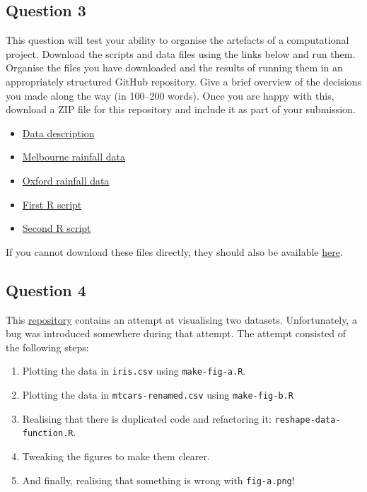 \documentclass[11pt,onecolumn]{scrartcl}
\begin{document}
\subsection{Question 3}
\label{sec:orgd334353}

This question will test your ability to organise the artefacts of a
computational project. Download the scripts and data files using the links below
and run them. Organise the files you have downloaded and the results of running
them in an appropriately structured GitHub repository. Give a brief overview of
the decisions you made along the way (in 100--200 words). Once you are happy
with this, download a ZIP file for this repository and include it as part of
your submission.

\begin{itemize}
\item \href{./homework-question-3/data-sources.txt}{Data description}
\item \href{./homework-question-3/melbourne.csv}{Melbourne rainfall data}
\item \href{./homework-question-3/oxford.txt}{Oxford rainfall data}
\item \href{./homework-question-3/combine-data.R}{First R script}
\item \href{./homework-question-3/make-plot.R}{Second R script}
\end{itemize}

If you cannot download these files directly, they should also be available \href{https://github.com/aezarebski/github-tutorial/tree/main/homework-question-3}{here}.

\subsection{Question 4}
\label{sec:orgcd75cba}

This \href{https://github.com/aezarebski/biology-github-tutorial}{repository} contains an attempt at visualising two datasets. Unfortunately,
a bug was introduced somewhere during that attempt. The attempt consisted of the
following steps:

\begin{enumerate}
\item Plotting the data in \texttt{iris.csv} using \texttt{make-fig-a.R}.
\item Plotting the data in \texttt{mtcars-renamed.csv} using \texttt{make-fig-b.R}
\item Realising that there is duplicated code and refactoring it:
\texttt{reshape-data-function.R}.
\item Tweaking the figures to make them clearer.
\item And finally, realising that something is wrong with \texttt{fig-a.png}!
\end{enumerate}
\end{document}
